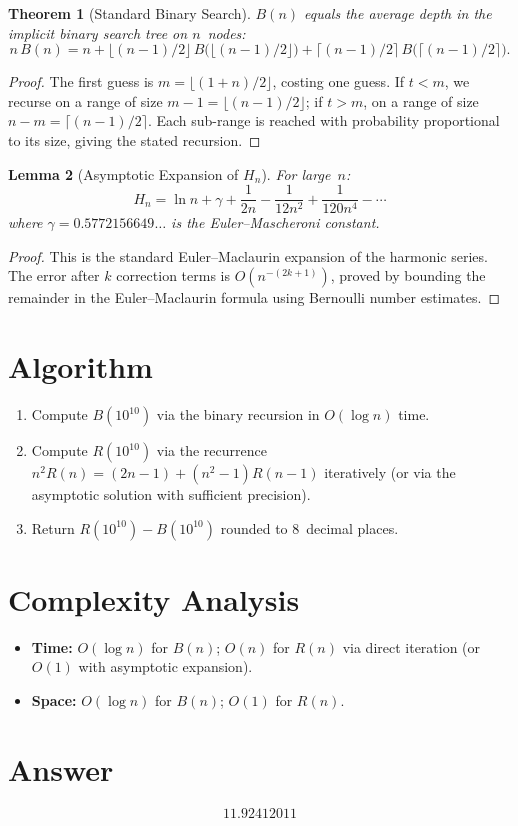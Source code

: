 \documentclass[11pt]{article}
\newtheorem{theorem}{Theorem}
\newtheorem{lemma}[theorem]{Lemma}
\begin{document}
\begin{theorem}[Standard Binary Search]
$B(n)$ equals the average depth in the implicit binary search tree on $n$~nodes:
\[
n\,B(n) = n + \lfloor(n-1)/2\rfloor\,B\bigl(\lfloor(n-1)/2\rfloor\bigr) + \lceil(n-1)/2\rceil\,B\bigl(\lceil(n-1)/2\rceil\bigr).
\]
\end{theorem}

\begin{proof}
The first guess is $m = \lfloor(1+n)/2\rfloor$, costing one guess. If $t < m$, we recurse on a range of size $m-1 = \lfloor(n-1)/2\rfloor$; if $t > m$, on a range of size $n - m = \lceil(n-1)/2\rceil$. Each sub-range is reached with probability proportional to its size, giving the stated recursion.
\end{proof}

\begin{lemma}[Asymptotic Expansion of $H_n$]
For large~$n$:
\[
H_n = \ln n + \gamma + \frac{1}{2n} - \frac{1}{12n^2} + \frac{1}{120n^4} - \cdots
\]
where $\gamma = 0.5772156649\ldots$ is the Euler--Mascheroni constant.
\end{lemma}

\begin{proof}
This is the standard Euler--Maclaurin expansion of the harmonic series. The error after $k$ correction terms is $O(n^{-(2k+1)})$, proved by bounding the remainder in the Euler--Maclaurin formula using Bernoulli number estimates.
\end{proof}

\section{Algorithm}

\begin{enumerate}
    \item Compute $B(10^{10})$ via the binary recursion in $O(\log n)$ time.
    \item Compute $R(10^{10})$ via the recurrence $n^2 R(n) = (2n-1)+(n^2-1)R(n-1)$ iteratively (or via the asymptotic solution with sufficient precision).
    \item Return $R(10^{10}) - B(10^{10})$ rounded to 8~decimal places.
\end{enumerate}

\section{Complexity Analysis}
\begin{itemize}
    \item \textbf{Time:} $O(\log n)$ for $B(n)$; $O(n)$ for $R(n)$ via direct iteration (or $O(1)$ with asymptotic expansion).
    \item \textbf{Space:} $O(\log n)$ for $B(n)$; $O(1)$ for $R(n)$.
\end{itemize}

\section{Answer}

\[
\boxed{11.92412011}
\]
\end{document}
